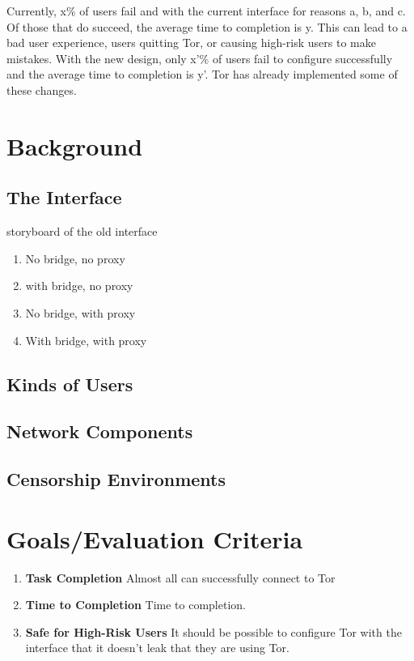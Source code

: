 \documentclass{template}
\begin{document}
Currently, x\% of users fail and with the current interface for reasons a, b, and c. Of those that do succeed, the average time to completion is y. This can lead to a bad user experience, users quitting Tor, or causing high-risk users to make mistakes. With the new design, only x'\% of users fail to configure successfully and the average time to completion is y'. Tor has already implemented some of these changes. 

\section{Background} 
\subsection{The Interface} 
{\color {red} storyboard of the old interface 

\begin{enumerate} \itemsep1pt \parskip0pt 
    \item No bridge, no proxy
    \item with bridge, no proxy
    \item No bridge, with proxy
    \item With bridge, with proxy
\end{enumerate}
}
\subsection{Kinds of Users} 
\subsection{Network Components} 
\subsection{Censorship Environments} 

\section{Goals/Evaluation Criteria} 
\begin{enumerate} \itemsep1pt \parskip0pt 
    \item {\bfseries Task Completion} Almost all can successfully connect to Tor
    \item {\bfseries Time to Completion} Time to completion. 
    \item {\bfseries Safe for High-Risk Users} It should be possible to configure Tor with the interface that it doesn't leak that they are using Tor. 
\end{enumerate}
\end{document}
